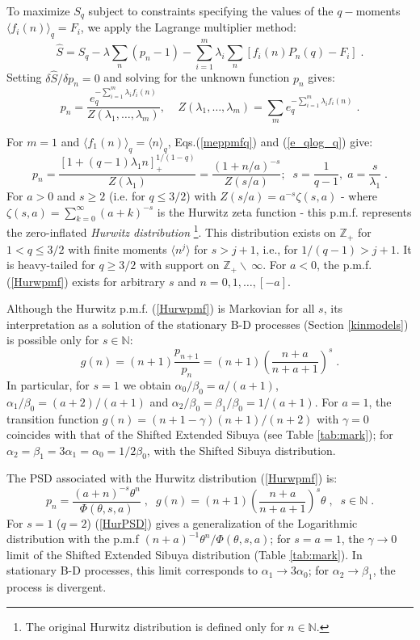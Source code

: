 \documentclass[a4paper,12pt]{amsart}
\newcommand{\N}{\mathbb{N}}
\newcommand{\Z}{\mathbb{Z}_{+}}
\theoremstyle{definition}
\theoremstyle{remark}
\begin{document}
To maximize $S_q$ subject to constraints specifying the values of the $q-$moments $\langle f_i(n) \rangle_q =F_i$, we apply the Lagrange multiplier method:
\[
\hat{S}=S_q - \lambda \sum_n (p_n-1) -  \sum_{i=1}^m \lambda_i \sum_n [f_i(n) P_n (q)  - F_i]\;.
\]
Setting $\delta \hat{S}/\delta p_n=0$ and solving for the unknown function $p_n$ gives:
\begin{equation} \label{meppmfq}
p_n=\frac{e_q^{-\sum_{i=1}^m \lambda_i f_i(n)}}{Z(\lambda_1,\ldots,\lambda_m)},\;\;\;\;
Z(\lambda_1,\ldots,\lambda_m)=  \sum_m e_q^{ -\sum_{i=1}^m \lambda_i f_i(n)}\;.
\end{equation}

For $m=1$ and $\langle f_1(n) \rangle_q =\langle n \rangle_q$, Eqs.(\ref{meppmfq}) and (\ref{e_qlog_q}) give:
\begin{equation}\label{Hurwpmf}
p_n
=\frac{[1+(q-1)\lambda_1 n]_{+}^{1/(1-q)} }{Z(\lambda_1)}
=\frac{(1 +  n/a)^{-s}}{Z(s/a)}
;\;\; s=\frac{1}{q-1},\; a=\frac{s}{\lambda_1}\;.
\end{equation}
For $a>0$  and $s\geq 2$ (i.e. for $q\leq3/2$) with 
$Z(s/a)=a^{-s}\zeta (s,a)$ - where $\zeta (s,a)=\sum _{k=0}^{\infty } (a+k)^{-s}$ is the Hurwitz zeta function - this p.m.f. represents the zero-inflated {\it Hurwitz distribution} \cite{JKK2005} \footnote{The original Hurwitz distribution is defined only for $n\in \N$.}.
This distribution exists on $\Z$ for $1<q\leq 3/2$ with finite moments $\langle n^j \rangle$ for $s>j+1$, i.e., for $1/(q-1)>j+1$. It is heavy-tailed for $q \geq 3/2$ with support on $\Z \backslash~ \infty$.
For $a<0$, the p.m.f. (\ref{Hurwpmf}) exists for arbitrary $s$ and $n=0,1,\ldots, [-a]$. 

Although the Hurwitz p.m.f. (\ref{Hurwpmf}) is Markovian for all $s$, its interpretation as a solution of the stationary B-D processes (Section \ref{kinmodels}) is possible only for  $s\in \N$:
\begin{equation} \label{Hurwgn}
    g(n)=(n+1)\frac{p_{n+1}}{p_n}
    =(n+1)\left(\frac{n+a}{n+a+1}\right)^s\;.
\end{equation}
In particular, for $s=1$ we obtain $\alpha_0/\beta_0=a/(a+1)$, $\alpha_1/\beta_0=(a+2)/(a+1)$ and $\alpha_2/\beta_0=\beta_1/\beta_0=1/(a+1)$. 
For $a=1$, the transition function $g(n)=(n+1-\gamma)(n+1)/(n+2)$ with $\gamma=0$ coincides with that of the Shifted Extended Sibuya  (see Table \ref{tab:mark}); for $\alpha_2 = \beta_1 = 3\alpha_1 = \alpha_0=1/2 \beta_0$, with the Shifted  Sibuya distribution.
 

The PSD associated with the Hurwitz distribution (\ref{Hurwpmf}) is:
\begin{equation}\label{HurPSD}
 p_n = \frac{(a +  n)^{-s}\theta^n}{\Phi (\theta,s,a)}\;,\;\;g(n)
    =(n+1)\left(\frac{n+a}{n+a+1}\right)^s \theta\;,\;\; s\in \N\;.
\end{equation}
For $s=1$ ($q=2$)  (\ref{HurPSD}) gives a  generalization of the Logarithmic distribution with the p.m.f $(n+a)^{-1}\theta^n/\Phi (\theta, s, a)$; for $s=a=1$, the $\gamma\to 0$ limit  of the Shifted Extended Sibuya distribution  (Table \ref{tab:mark}). In stationary B-D processes, this limit corresponds to $\alpha_1 \to 3\alpha_0$; for $\alpha_2 \to \beta_1$, the process is divergent.
\end{document}
